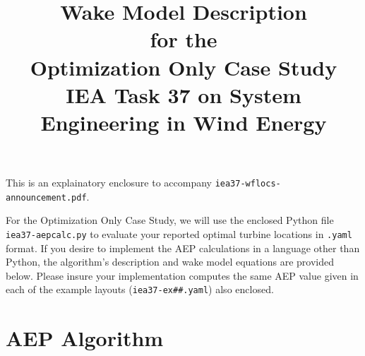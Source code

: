 \documentclass[12pt]{article}
\begin{document}
\title{\vspace{-3cm}Wake Model Description \\ \small{for the} \\ \large{Optimization Only Case Study} \\
    \small{IEA Task 37 on System Engineering in Wind Energy}}
    \date{\vspace{-2.8cm}}
\maketitle

This is an explainatory enclosure to accompany \texttt{iea37-wflocs-announcement.pdf}.

\indent For the Optimization Only Case Study, we will use the enclosed Python file \texttt{iea37-aepcalc.py} to evaluate your reported optimal turbine locations in \texttt{.yaml} format.
If you desire to implement the AEP calculations in a language other than Python, the algorithm's description and wake model equations are provided below.
Please insure your implementation computes the same AEP value given in each of the example layouts (\texttt{iea37-ex\#\#.yaml}) also enclosed.

\section*{AEP Algorithm}
    
\end{document}
